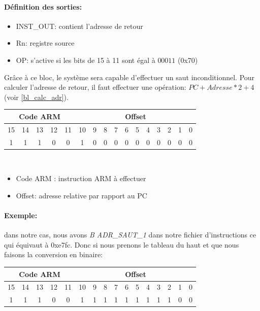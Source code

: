 \documentclass[a4paper]{article} %
\begin{document}
\paragraph{Définition des sorties:}
\begin{itemize}
    \item     INST\_OUT: contient l'adresse de retour
    \item     Rn: registre source
    \item     OP: s'active si les bits de 15 à 11 sont égal à $00011$ (0x70)
\end{itemize}

\medskip
Grâce à ce bloc, le système sera capable d'effectuer un saut inconditionnel. Pour calculer l'adresse de retour, il faut effectuer une opération: $PC + Adresse*2 + 4$ (voir \ref{bl_calc_adr}).\\

\begin{tabular}{|ccccc|ccccccccccc|}
    \hline
    \multicolumn{5}{|c|}{Code ARM}  & \multicolumn{11}{|c|}{Offset}\\
    \hline
    15 & 14 & 13 & 12 & 11          & 10 & 9 & 8 & 7 & 6 & 5 & 4 & 3 & 2 & 1 & 0 \\
    \hline
    1  & 1  & 1  & 0  & 0           & 1  & 0 & 0 & 0 & 0 & 0 & 0 & 0 & 0 & 0 & 0\\
    \hline     
    \end{tabular}
    \\
\begin{itemize}
    \item     Code ARM : instruction ARM à effectuer
    \item     Offset: adresse relative par rapport au PC
\end{itemize}


\paragraph{Exemple:} dans notre cas, nous avons \textit{B ADR\_SAUT\_1} dans notre fichier d'instructions ce qui équivaut à 0xe7fc. Donc si nous prenons le tableau du haut et que nous faisons la conversion en binaire:
\\
\begin{tabular}{|ccccc|ccccccccccc|}
    \hline
    \multicolumn{5}{|c|}{Code ARM}  & \multicolumn{11}{|c|}{Offset}\\
    \hline
    15 & 14 & 13 & 12 & 11          & 10 & 9 & 8 & 7 & 6 & 5 & 4 & 3 & 2 & 1 & 0 \\
    \hline
    1  & 1  & 1  & 0  & 0           & 1  & 1 & 1 & 1 & 1 & 1 & 1 & 1 & 1 & 0 & 0\\
    \hline     
    \end{tabular}
    
\end{document}
